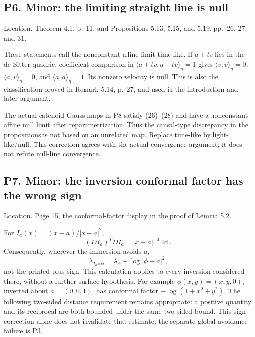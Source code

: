 \documentclass[10pt]{article}
\begin{document}
\subsection*{P6. Minor: the limiting straight line is null}
Location. Theorem 4.1, p. 11, and Propositions 5.13, 5.15, and 5.19, pp. 26, 27, and 31.\par
These statements call the nonconstant affine limit time-like. If \(a+tv\) lies in the de Sitter quadric, coefficient comparison in \(\langle a+tv,a+tv\rangle_\eta=1\) gives \(\langle v,v\rangle_\eta=0\), \(\langle a,v\rangle_\eta=0\), and \(\langle a,a\rangle_\eta=1\). Its nonzero velocity is null. This is also the classification proved in Remark 5.14, p. 27, and used in the introduction and later argument.\par
The actual catenoid Gauss maps in P8 satisfy (26)–(28) and have a nonconstant affine null limit after reparametrization. Thus the causal-type discrepancy in the propositions is not based on an unrelated map. Replace time-like by light-like/null. This correction agrees with the actual convergence argument; it does not refute null-line convergence.\par
\subsection*{P7. Minor: the inversion conformal factor has the wrong sign}
Location. Page 15, the conformal-factor display in the proof of Lemma 5.2.\par
For \(I_a(x)=(x-a)/|x-a|^2\), \[(DI_a)^TDI_a=|x-a|^{-4}\operatorname{Id}.\] Consequently, wherever the immersion avoids \(a\), \[\lambda_{I_a\circ\phi}=\lambda_\phi-\log|\phi-a|^2,
 \tag{P7.1}\] not the printed plus sign. This calculation applies to every inversion considered there, without a further surface hypothesis. For example \(\phi(x,y)=(x,y,0)\), inverted about \(a=(0,0,1)\), has conformal factor \(-\log(1+x^2+y^2)\). The following two-sided distance requirement remains appropriate: a positive quantity and its reciprocal are both bounded under the same two-sided bound. This sign correction alone does not invalidate that estimate; the separate global avoidance failure is P3.\par
\end{document}
